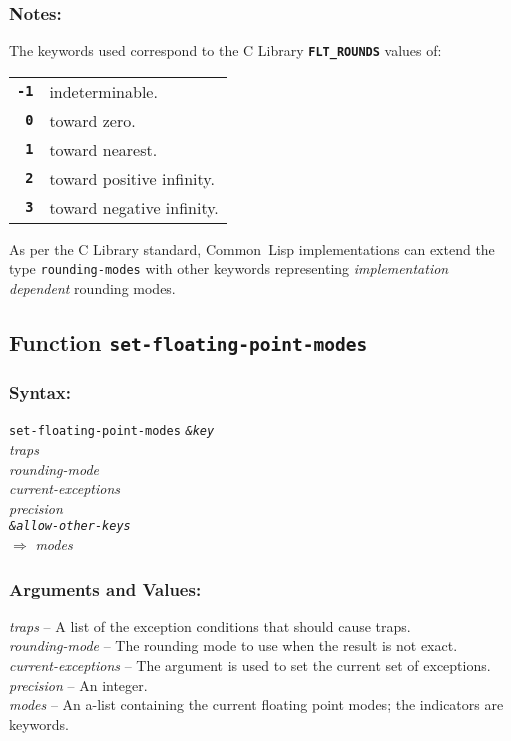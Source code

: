 \documentclass[fleqn]{article}
\newcommand{\CL}{\textsf{Common~Lisp}}
\newcommand{\code}[1]{\texttt{#1}}
\newcommand{\varname}[1]{\textit{#1}}
\newcommand{\DDictionaryItem}[1]{\vspace*{6pt}\noindent\hrulefill\vspace*{-9pt}\subsection*{#1}}
\begin{document}
\subsubsection*{Notes:}

The keywords used correspond to the C Library \cite{C18}
\textbf{\code{FLT\_ROUNDS}} values of:

\vspace*{3mm}

\begin{tabular}{rl}
  \textbf{\code{-1}} & indeterminable.\\
  \textbf{\code{0}}  & toward zero.\\
  \textbf{\code{1}}  & toward nearest.\\
  \textbf{\code{2}}  & toward positive infinity.\\
  \textbf{\code{3}}  & toward negative infinity.\\
\end{tabular}

\vspace*{3mm}

As per the C Library standard, \CL{} implementations can extend the
type \code{rounding-modes} with other keywords representing
\emph{implementation dependent} rounding modes.



\DDictionaryItem{Function \code{set-floating-point-modes}}

\subsubsection*{Syntax:}

\begin{tabbing}
\code{set-floating-point-modes} \= \textit{\code{\&key}}\\
\>\varname{traps}\\
\>\varname{rounding-mode}\\
\>\varname{current-exceptions}\\
\>\varname{precision}\\
\>\varname{\code{\&allow-other-keys}}\\
$\Rightarrow$ \varname{modes}
\end{tabbing}


\subsubsection*{Arguments and Values:}

\varname{traps} -- A list of the exception conditions that should cause
traps.\\
\varname{rounding-mode} -- The rounding mode to use when the result is
not exact.\\
\varname{current-exceptions} -- The argument is used to set the current
set of exceptions.\\
\varname{precision} -- An integer.\\
\varname{modes} -- An a-list containing the current floating
point modes; the indicators are keywords.
\end{document}

